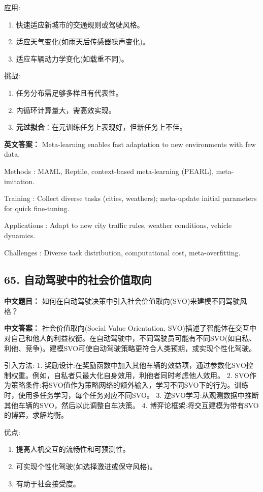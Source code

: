 \documentclass[10pt,a4paper]{ctexart}
\begin{document}
 应用:
\begin{enumerate}
    \item 快速适应新城市的交通规则或驾驶风格。
    \item 适应天气变化(如雨天后传感器噪声变化)。
    \item 适应车辆动力学变化(如载重不同)。
\end{enumerate}

 挑战:
\begin{enumerate}
    \item 任务分布需足够多样且有代表性。
    \item 内循环计算量大，需高效实现。
    \item \textbf{元过拟合}：在元训练任务上表现好，但新任务上不佳。
\end{enumerate}

\textbf{英文答案：}  
Meta-learning enables fast adaptation to new environments with few data.

 Methods : MAML, Reptile, context-based meta-learning (PEARL), meta-imitation.

 Training : Collect diverse tasks (cities, weathers); meta-update initial parameters for quick fine-tuning.

 Applications : Adapt to new city traffic rules, weather conditions, vehicle dynamics.

 Challenges : Diverse task distribution, computational cost, meta-overfitting.

\subsection*{65. 自动驾驶中的社会价值取向}
\textbf{中文题目：} 如何在自动驾驶决策中引入社会价值取向(SVO)来建模不同驾驶风格？

\textbf{中文答案：}  
社会价值取向(Social Value Orientation, SVO)描述了智能体在交互中对自己和他人的利益权衡。在自动驾驶中，不同驾驶员可能有不同SVO(如自私、利他、竞争)。建模SVO可使自动驾驶策略更符合人类预期，或实现个性化驾驶。

 引入方法:
1.  奖励设计:在奖励函数中加入其他车辆的效益项，通过参数化SVO控制权重。例如，自私者只最大化自身效用，利他者同时考虑他人效用。
2.  SVO作为策略条件:将SVO值作为策略网络的额外输入，学习不同SVO下的行为。训练时，使用多任务学习，每个任务对应不同SVO。
3.  逆SVO学习:从观测数据中推断其他车辆的SVO，然后以此调整自车决策。
4.  博弈论框架:将交互建模为带有SVO的博弈，求解均衡。

 优点:
\begin{enumerate}
    \item 提高人机交互的流畅性和可预测性。
    \item 可实现个性化驾驶(如选择激进或保守风格)。
    \item 有助于社会接受度。
\end{enumerate}
\end{document}
